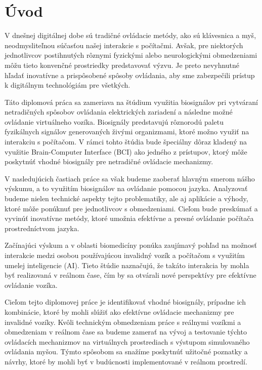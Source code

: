 \chapter*{Úvod} %

{ 
\tab[5mm] V dnešnej digitálnej dobe sú tradičné ovládacie metódy, ako sú klávesnica a myš, neodmysliteľnou súčasťou našej interakcie s počítačmi. Avšak, pre niektorých jednotlivcov postihnutých rôznymi fyzickými alebo neurologickými obmedzeniami môžu tieto konvenčné prostriedky predstavovať výzvu. Je preto nevyhnutné hľadať inovatívne a prispôsobené spôsoby ovládania, aby sme zabezpečili prístup k digitálnym technológiám pre všetkých.

\tab[5mm] Táto diplomová práca sa zameriava na štúdium využitia biosignálov pri vytváraní netradičných spôsobov ovládania elektrických zariadení a následne možné ovládanie virtuálneho vozíka. Biosignály predstavujú rôznorodú paletu fyzikálnych signálov generovaných živými organizmami, ktoré možno využiť na interakciu s počítačom. V rámci tohto štúdia bude špeciálny dôraz kladený na využitie Brain-Computer Interface (BCI) ako jedného z prístupov, ktorý môže poskytnúť vhodné biosignály pre netradičné ovládacie mechanizmy.

\tab[5mm] V nasledujúcich častiach práce sa však budeme zaoberať hlavným smerom nášho výskumu, a to využitím biosignálov na ovládanie pomocou jazyka. Analyzovať budeme nielen technické aspekty tejto problematiky, ale aj aplikácie a výhody, ktoré môže ponúknuť pre jednotlivcov s obmedzeniami. Cieľom bude preskúmať a vyvinúť inovatívne metódy, ktoré umožnia efektívne a presné ovládanie počítača prostredníctvom jazyka.
}

{ 
\tab[5mm] Začínajúci výskum \cite{s16111806} a \cite{app12178880} v oblasti biomedicíny ponúka zaujímavý pohľad na možnosť interakcie medzi osobou používajúcou invalidný vozík a počítačom s využitím umelej inteligencie (AI). Tieto štúdie naznačujú, že takáto interakcia by mohla byť realizovaná v reálnom čase, čím by sa otvárali nové perspektívy pre efektívne ovládanie vozíka.

}

{
\tab[5mm] Cieľom tejto diplomovej práce je identifikovať vhodné biosignály, prípadne ich kombinácie, ktoré by mohli slúžiť ako efektívne ovládacie mechanizmy pre invalidné vozíky. Kvôli technickým obmedzeniam práce s reálnymi vozíkmi a obmedzeniam v reálnom čase sa budeme zamerať na vývoj a testovanie týchto ovládacích mechanizmov na virtuálnych prostrediach s výstupom simulovaného ovládania myšou. Týmto spôsobom sa snažíme poskytnúť užitočné poznatky a návrhy, ktoré by mohli byť v budúcnosti implementované v reálnom prostredí.
}